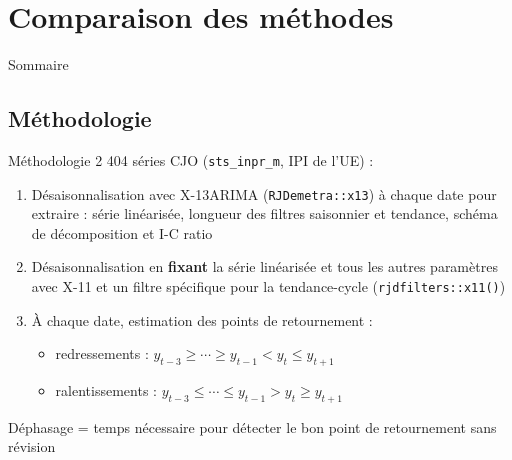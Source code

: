 \documentclass[10pt,xcolor=table,color={dvipsnames,usenames},ignorenonframetext,usepdftitle=false,french]{beamer}
\providecommand{\tightlist}{%
  \setlength{\parskip}{0pt}
  }
\newcommand\1{\mathds{1}}
\begin{document}
\hypertarget{comparaison-des-muxe9thodes}{%
\section{Comparaison des méthodes}\label{comparaison-des-muxe9thodes}}

\begin{frame}{Sommaire}
\protect\hypertarget{sommaire-1}{}
\end{frame}

\hypertarget{muxe9thodologie}{%
\subsection{Méthodologie}\label{muxe9thodologie}}

\begin{frame}[fragile]{Méthodologie}
\protect\hypertarget{muxe9thodologie-1}{}
2 404 séries CJO (\texttt{sts\_inpr\_m}, IPI de l'UE) :

\begin{enumerate}
\tightlist
\item
  Désaisonnalisation avec X-13ARIMA (\texttt{RJDemetra::x13}) à chaque
  date pour extraire : série linéarisée, longueur des filtres saisonnier
  et tendance, schéma de décomposition et I-C ratio
\end{enumerate}

\pause

\begin{enumerate}
\setcounter{enumi}{1}
\tightlist
\item
  Désaisonnalisation en \textbf{fixant} la série linéarisée et tous les
  autres paramètres avec X-11 et un filtre spécifique pour la
  tendance-cycle (\texttt{rjdfilters::x11()})
\end{enumerate}

\pause

\begin{enumerate}
\setcounter{enumi}{2}
\item
  À chaque date, estimation des points de retournement :

  \begin{itemize}
  \item
    redressements : \(y_{t-3}\geq\cdots\geq y_{t-1}<y_t\leq y_{t+1}\)
  \item
    ralentissements : \(y_{t-3}\leq\cdots\leq y_{t-1}>y_t\geq y_{t+1}\)
  \end{itemize}
\end{enumerate}

\pause

Déphasage = temps nécessaire pour détecter le bon point de retournement
sans révision
\end{frame}
\end{document}
